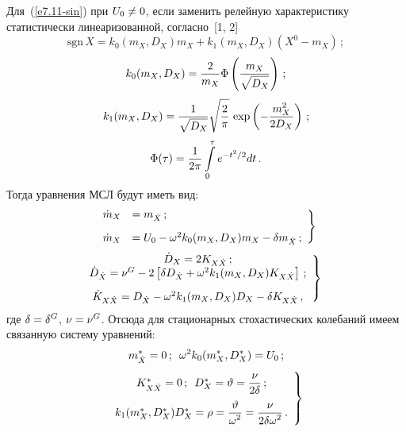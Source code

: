 \begin{multicols}{2}
Для~(\ref{e7.11-sin}) при  $U_0\hm\ne 0$, если заменить релейную характеристику 
статистически линеаризованной, согласно~[1, 2]
\begin{equation*}
\mathrm{sgn}\, X = k_0 (m_X, D_X) m_X + k_1 (m_X, D_X) (X^0 - m_X)\,; %
\end{equation*}
    $$
    k_0(m_X, D_X) =\displaystyle\frac{\displaystyle 2\mathstrut}{\displaystyle  m_X\mathstrut} \Phi \left( \displaystyle\frac{\displaystyle m_X\mathstrut}{\displaystyle \sqrt{D_X}\mathstrut}\right)\,;
    $$
    $$ 
    k_1 (m_X,D_X) = \displaystyle\frac{\displaystyle 1\mathstrut}{\displaystyle \sqrt{D_X}\mathstrut} \sqrt{\displaystyle\frac{\displaystyle 2\mathstrut}{\displaystyle \pi\mathstrut}}\, \exp \left( -\displaystyle\frac{\displaystyle m_X^2\mathstrut}{\displaystyle 2D_X\mathstrut}\right)\,;
    $$
\begin{equation}
\Phi (\tau) = \displaystyle\frac{\displaystyle 1\mathstrut}{\displaystyle 2\pi\mathstrut} \int\limits_0^\tau e^{-t^2/2} dt\,.\label{e7.15-sin}
\end{equation}
Тогда уравнения МСЛ будут иметь вид:
\begin{equation}
\left.
\begin{array}{rl}
\dot m_X &= m_{\dot X}\,;\\[9pt]
\dot m_X &= U_0 - \omega^2 k_0 (m_X, D_X) m_X -\delta m_{\dot X}\,;
\end{array}
\right\}
\label{e7.16-sin}
\end{equation}
    \begin{equation}
\left.
\hspace*{-3.5mm}\begin{array}{c}
    \dot D_X = 2 K_{X\dot X}\,;
\\
    \dot D_{\dot X} = \nu^G - 2\lk \delta D_{\dot X} + \w^2 k_1(m_X,D_X) K_{X\dot X}\rk\,;\\[9pt]
    \dot K_{X\dot X} = D_{\dot X} - \w^2 k_1 (m_X, D_X) D_X - \delta K_{X\dot X}\,,
    \end{array}
    \right\}\!\!
    \label{e7.17-sin}
    \end{equation}
где $\delta \hm= \delta^G$, $\nu\hm=\nu^G$.
Отсюда для стационарных стохастических колебаний имеем связанную систему уравнений:
\begin{equation}
m_{\dot X}^* =0\,;\enskip \omega^2 k_0 (m_X^*, D_X^*) = U_0\,;\label{e7.18-sin}
\end{equation}
\begin{equation}
\left.
\begin{array}{c}
K_{X\dot X}^* =0\,;\enskip 
D_X^* =\vartheta=\displaystyle \displaystyle\frac{\displaystyle \nu\mathstrut}{\displaystyle  2\delta\mathstrut}\,;\\[9pt]
k_1(m_X^*, D_X^*) D_X^* =\rho= \displaystyle \displaystyle\frac{\displaystyle \vartheta\mathstrut}{\displaystyle \omega^2\mathstrut} =\displaystyle\frac{\displaystyle \nu\mathstrut}{\displaystyle  2\delta \omega^2\mathstrut}\,.
\end{array}
\right\}
\label{e7.19-sin}
\end{equation}


\end{multicols}
